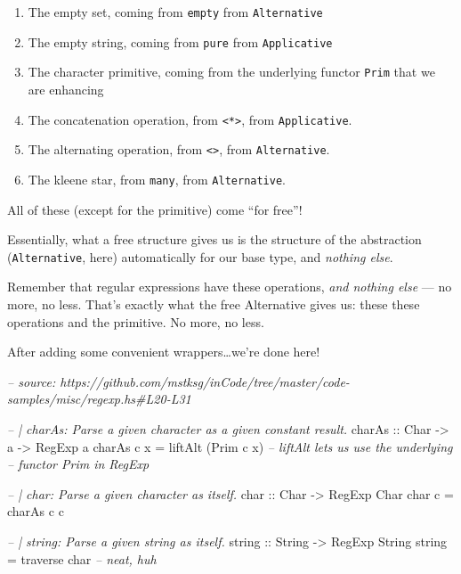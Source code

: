 \documentclass[]{article}
\newenvironment{Shaded}{}{}
\newcommand{\CommentTok}[1]{\textcolor[rgb]{0.38,0.63,0.69}{\textit{#1}}}
\newcommand{\DataTypeTok}[1]{\textcolor[rgb]{0.56,0.13,0.00}{#1}}
\newcommand{\FunctionTok}[1]{\textcolor[rgb]{0.02,0.16,0.49}{#1}}
\newcommand{\NormalTok}[1]{#1}
\newcommand{\OtherTok}[1]{\textcolor[rgb]{0.00,0.44,0.13}{#1}}
\begin{document}
\begin{enumerate}
\def\labelenumi{\arabic{enumi}.}
\tightlist
\item
  The empty set, coming from \texttt{empty} from \texttt{Alternative}
\item
  The empty string, coming from \texttt{pure} from \texttt{Applicative}
\item
  The character primitive, coming from the underlying functor \texttt{Prim} that
  we are enhancing
\item
  The concatenation operation, from \texttt{\textless{}*\textgreater{}}, from
  \texttt{Applicative}.
\item
  The alternating operation, from \texttt{\textless{}\textbar{}\textgreater{}},
  from \texttt{Alternative}.
\item
  The kleene star, from \texttt{many}, from \texttt{Alternative}.
\end{enumerate}

All of these (except for the primitive) come ``for free''!

Essentially, what a free structure gives us is the structure of the abstraction
(\texttt{Alternative}, here) automatically for our base type, and \emph{nothing
else}.

Remember that regular expressions have these operations, \emph{and nothing else}
--- no more, no less. That's exactly what the free Alternative gives us: these
these operations and the primitive. No more, no less.

After adding some convenient wrappers\ldots{}we're done here!

\begin{Shaded}
\begin{Highlighting}[]
\CommentTok{-- source: https://github.com/mstksg/inCode/tree/master/code-samples/misc/regexp.hs#L20-L31}

\CommentTok{-- | charAs: Parse a given character as a given constant result.}
\OtherTok{charAs ::} \DataTypeTok{Char} \OtherTok{->}\NormalTok{ a }\OtherTok{->} \DataTypeTok{RegExp}\NormalTok{ a}
\NormalTok{charAs c x }\FunctionTok{=}\NormalTok{ liftAlt (}\DataTypeTok{Prim}\NormalTok{ c x)     }\CommentTok{-- liftAlt lets us use the underlying}
                                    \CommentTok{-- functor Prim in RegExp}

\CommentTok{-- | char: Parse a given character as itself.}
\OtherTok{char ::} \DataTypeTok{Char} \OtherTok{->} \DataTypeTok{RegExp} \DataTypeTok{Char}
\NormalTok{char c }\FunctionTok{=}\NormalTok{ charAs c c}

\CommentTok{-- | string: Parse a given string as itself.}
\OtherTok{string ::} \DataTypeTok{String} \OtherTok{->} \DataTypeTok{RegExp} \DataTypeTok{String}
\NormalTok{string }\FunctionTok{=} \FunctionTok{traverse}\NormalTok{ char              }\CommentTok{-- neat, huh}
\end{Highlighting}
\end{Shaded}
\end{document}

